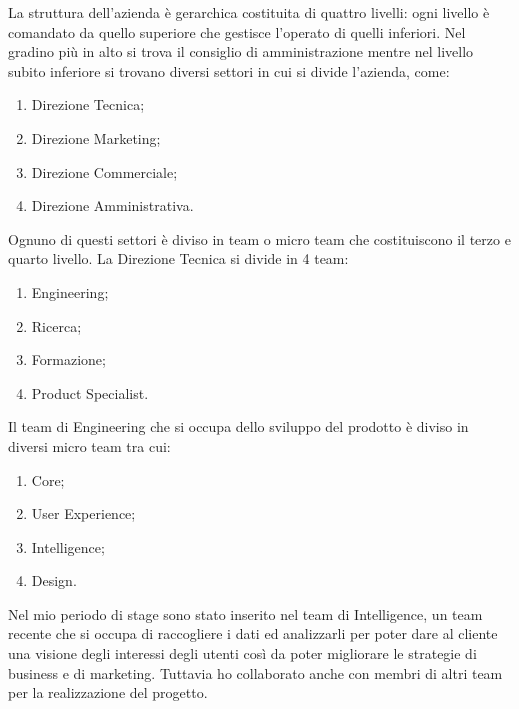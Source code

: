 \documentclass[a4paper, 12pt, twoside, openright]{book}
\begin{document}
La struttura dell'azienda è gerarchica costituita di quattro livelli: ogni livello è comandato da quello superiore che gestisce l'operato di quelli inferiori. Nel gradino più in alto si trova il consiglio di amministrazione mentre nel livello subito inferiore si trovano diversi settori in cui si divide l'azienda, come:
\begin{enumerate}
\item Direzione Tecnica;
\item Direzione Marketing;
\item Direzione Commerciale;
\item Direzione Amministrativa.
\end{enumerate}
Ognuno di questi settori è diviso in team o micro team che costituiscono il terzo e quarto livello. La Direzione Tecnica si divide in 4 team:
\begin{enumerate}
\item Engineering;
\item Ricerca;
\item Formazione;
\item Product Specialist.
\end{enumerate}
Il team di Engineering che si occupa dello sviluppo del prodotto è diviso in diversi micro team tra cui:
\begin{enumerate}
\item Core;
\item User Experience;
\item Intelligence;
\item Design.
\end{enumerate}
Nel mio periodo di stage sono stato inserito nel team di Intelligence, un team recente che si occupa di raccogliere i dati ed analizzarli per poter dare al cliente una visione degli interessi degli utenti così da poter migliorare le strategie di business e di marketing. Tuttavia ho collaborato anche con membri di altri team per la realizzazione del progetto.

\newpage{}
\end{document}
